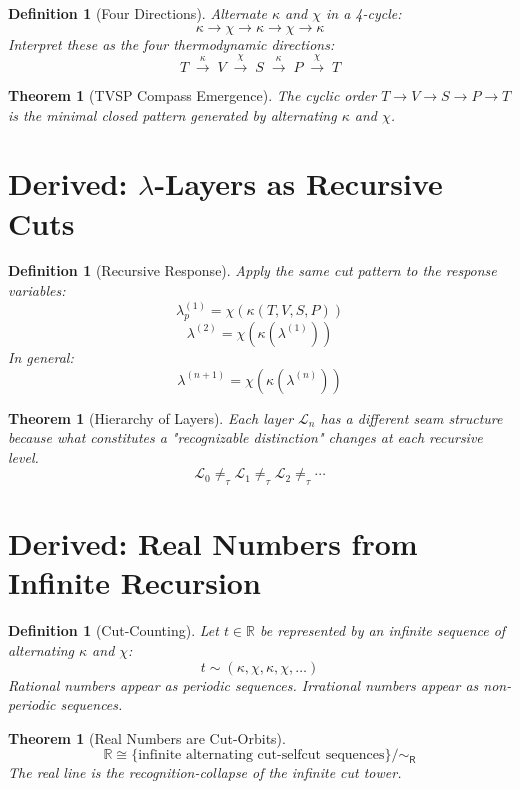 \documentclass[12pt]{article}
\newtheorem{definition}[axiom]{Definition}
\newtheorem{theorem}[axiom]{Theorem}
\newcommand{\cut}{\kappa}
\newcommand{\selfcut}{\chi}
\newcommand{\rec}{\mathsf{R}}
\begin{document}
\begin{definition}[Four Directions]
Alternate $\cut$ and $\selfcut$ in a 4-cycle:
\[
\cut \longrightarrow \selfcut \longrightarrow \cut \longrightarrow \selfcut \longrightarrow \cut
\]
Interpret these as the four thermodynamic directions:
\[
\boxed{T \;\xrightarrow{\cut}\; V \;\xrightarrow{\selfcut}\; S \;\xrightarrow{\cut}\; P \;\xrightarrow{\selfcut}\; T}
\]
\end{definition}

\begin{theorem}[TVSP Compass Emergence]
The cyclic order $T \to V \to S \to P \to T$ is the minimal closed pattern
generated by alternating $\cut$ and $\selfcut$.
\end{theorem}

\section{Derived: $\lambda$-Layers as Recursive Cuts}

\begin{definition}[Recursive Response]
Apply the same cut pattern to the response variables:
\[
\lambda^{(1)}_p = \selfcut(\cut(T,V,S,P))
\]
\[
\lambda^{(2)} = \selfcut(\cut(\lambda^{(1)}))
\]
In general:
\[
\lambda^{(n+1)} = \selfcut(\cut(\lambda^{(n)}))
\]
\end{definition}

\begin{theorem}[Hierarchy of Layers]
Each layer $\mathcal{L}_n$ has a different seam structure because
what constitutes a "recognizable distinction" changes at each recursive level.
\[
\mathcal{L}_0 \neq_{\tau} \mathcal{L}_1 \neq_{\tau} \mathcal{L}_2 \neq_{\tau} \cdots
\]
\end{theorem}

\section{Derived: Real Numbers from Infinite Recursion}

\begin{definition}[Cut-Counting]
Let $t \in \mathbb{R}$ be represented by an infinite sequence of alternating $\cut$ and $\selfcut$:
\[
t \sim (\cut, \selfcut, \cut, \selfcut, \ldots)
\]
Rational numbers appear as periodic sequences.
Irrational numbers appear as non-periodic sequences.
\end{definition}

\begin{theorem}[Real Numbers are Cut-Orbits]
\[
\boxed{\mathbb{R} \cong \{ \text{infinite alternating cut-selfcut sequences} \} / \sim_{\rec}}
\]
The real line is the recognition-collapse of the infinite cut tower.
\end{theorem}
\end{document}
